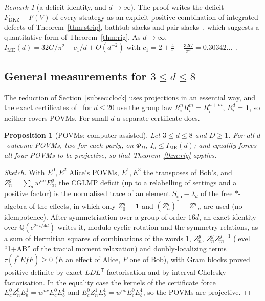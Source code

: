 \documentclass[11pt]{article}
\newtheorem{proposition}[lemma]{Proposition}
\theoremstyle{remark}
\newtheorem{remark}[lemma]{Remark}
\numberwithin{equation}{section}
\newcommand{\IME}{I_{\mathrm{ME}}}
\newcommand{\FD}{F_{\mathrm{DKZ}}}
\newcommand{\one}{\mathbf{1}}
\begin{document}
\begin{remark}[a deficit identity, and $d\to\infty$]\label{rem:limit}
The proof writes the deficit $\FD-F(V)$ of every strategy as an explicit positive combination of integrated defects of
Theorem~\ref{thm:strip}, bathtub slacks and pair slacks~\cite[Remark~7.1]{MSmath}, which suggests a quantitative form of
Theorem~\ref{thm:rig}. As $d\to\infty$, $\IME(d)=32G/\pi^2-c_1/d+O(d^{-2})$ with
$c_1=2+\frac4\pi-\frac{32G}{\pi^2}=0.30342\ldots$~\cite[Corollary~8.1]{MSmath}.
\end{remark}

\subsection{General measurements for \texorpdfstring{$3\le d\le8$}{3 <= d <= 8}}\label{subsec:povm}
The reduction of Section~\ref{subsec:clock} uses projections in an essential way, and the exact certificates
of~\cite{repoCGLMP} for $d\le20$ use the group law $R_i^nR_i^m=R_i^{n+m}$, $R_i^d=\one$, so neither covers POVMs. For small $d$ a
separate certificate does.

\begin{proposition}[POVMs; computer-assisted]\label{prop:povm}
Let $3\le d\le8$ and $D\ge1$. For all $d$-outcome POVMs, two for each party, on $\Phi_D$, $I_d\le\IME(d)$; and equality
forces all four POVMs to be projective, so that Theorem~\ref{thm:rig} applies.
\end{proposition}

\begin{proof}[Sketch]
With $E^0,E^2$ Alice's POVMs, $E^1,E^3$ the transposes of Bob's, and $Z^g_n=\sum_aw^{na}E^g_a$, the CGLMP deficit (up to
a relabelling of settings and a positive factor) is the normalised trace of an element $S_{\mathrm{op}}-\lambda_d$ of the free $*$-algebra of the
effects, in which only $Z^g_0=\one$ and $(Z^g_n)^*=Z^g_{-n}$ are used (no idempotence). After symmetrisation over a group
of order $16d$, an exact identity over $\mathbb Q(e^{2\pi i/4d})$ writes it, modulo cyclic rotation and the symmetry
relations, as a sum of Hermitian squares of combinations of the words $1$, $Z^g_n$, $Z^g_nZ^{g\pm1}_m$ (level ``1+AB''
of the tracial moment relaxation) and doubly-localizing terms $\tau(f^*EfF)\ge0$ ($E$ an effect of Alice, $F$ one of
Bob), with Gram blocks proved positive definite by exact $LDL^{\mathsf T}$ factorisation and by interval Cholesky
factorisation. In the equality case the kernels of the certificate force $E^0_cZ^0_nE^1_b=w^{nc}E^0_cE^1_b$ and
$E^0_cZ^1_nE^1_b=w^{nb}E^0_cE^1_b$, so the POVMs are projective.
\end{proof}
\end{document}
